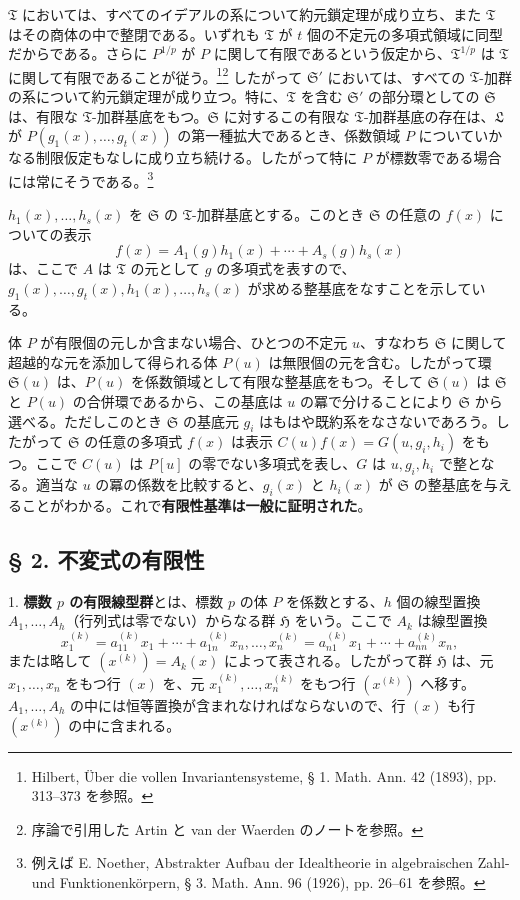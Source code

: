 \documentclass[11pt]{article}
\begin{document}
$\mathfrak T$ においては、すべてのイデアルの系について約元鎖定理が成り立ち、また $\mathfrak T$ はその商体の中で整閉である。いずれも $\mathfrak T$ が $t$ 個の不定元の多項式領域に同型だからである。さらに $P^{1/p}$ が $P$ に関して有限であるという仮定から、$\mathfrak T^{1/p}$ は $\mathfrak T$ に関して有限であることが従う。\footnote{Hilbert, Über die vollen Invariantensysteme, § 1. Math. Ann. 42 (1893), pp. 313--373 を参照。}\footnote{序論で引用した Artin と van der Waerden のノートを参照。} したがって $\mathfrak S'$ においては、すべての $\mathfrak T$-加群の系について約元鎖定理が成り立つ。特に、$\mathfrak T$ を含む $\mathfrak S'$ の部分環としての $\mathfrak S$ は、有限な $\mathfrak T$-加群基底をもつ。$\mathfrak S$ に対するこの有限な $\mathfrak T$-加群基底の存在は、$\mathfrak L$ が $P(g_1(x),\ldots,g_t(x))$ の第一種拡大であるとき、係数領域 $P$ についていかなる制限仮定もなしに成り立ち続ける。したがって特に $P$ が標数零である場合には常にそうである。\footnote{例えば E. Noether, Abstrakter Aufbau der Idealtheorie in algebraischen Zahl- und Funktionenkörpern, § 3. Math. Ann. 96 (1926), pp. 26--61 を参照。}

$h_1(x),\ldots,h_s(x)$ を $\mathfrak S$ の $\mathfrak T$-加群基底とする。このとき $\mathfrak S$ の任意の $f(x)$ についての表示
\[
 f(x)=A_1(g)h_1(x)+\cdots+A_s(g)h_s(x)
\]
は、ここで $A$ は $\mathfrak T$ の元として $g$ の多項式を表すので、$g_1(x),\ldots,g_t(x),h_1(x),\ldots,h_s(x)$ が求める整基底をなすことを示している。

体 $P$ が有限個の元しか含まない場合、ひとつの不定元 $u$、すなわち $\mathfrak S$ に関して超越的な元を添加して得られる体 $P(u)$ は無限個の元を含む。したがって環 $\mathfrak S(u)$ は、$P(u)$ を係数領域として有限な整基底をもつ。そして $\mathfrak S(u)$ は $\mathfrak S$ と $P(u)$ の合併環であるから、この基底は $u$ の冪で分けることにより $\mathfrak S$ から選べる。ただしこのとき $\mathfrak S$ の基底元 $g_i$ はもはや既約系をなさないであろう。したがって $\mathfrak S$ の任意の多項式 $f(x)$ は表示 $C(u)f(x)=G(u,g_i,h_i)$ をもつ。ここで $C(u)$ は $P[u]$ の零でない多項式を表し、$G$ は $u,g_i,h_i$ で整となる。適当な $u$ の冪の係数を比較すると、$g_i(x)$ と $h_i(x)$ が $\mathfrak S$ の整基底を与えることがわかる。これで\textbf{有限性基準は一般に証明された}。

\subsection*{§ 2. 不変式の有限性}

1. \textbf{標数 $p$ の有限線型群}とは、標数 $p$ の体 $P$ を係数とする、$h$ 個の線型置換 $A_1,\ldots,A_h$（行列式は零でない）からなる群 $\mathfrak H$ をいう。ここで $A_k$ は線型置換
\[
 x_1^{(k)}=a_{11}^{(k)}x_1+\cdots+a_{1n}^{(k)}x_n,
 \ldots,
 x_n^{(k)}=a_{n1}^{(k)}x_1+\cdots+a_{nn}^{(k)}x_n,
\]
または略して $(x^{(k)})=A_k(x)$ によって表される。したがって群 $\mathfrak H$ は、元 $x_1,\ldots,x_n$ をもつ行 $(x)$ を、元 $x_1^{(k)},\ldots,x_n^{(k)}$ をもつ行 $(x^{(k)})$ へ移す。$A_1,\ldots,A_h$ の中には恒等置換が含まれなければならないので、行 $(x)$ も行 $(x^{(k)})$ の中に含まれる。
\end{document}
